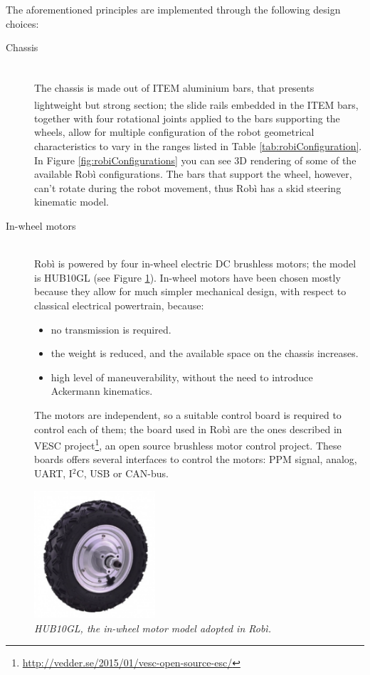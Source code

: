 The aforementioned principles are implemented through the following design choices:
\begin{description}
	\item[Chassis] \hfill \\ The chassis is made out of ITEM\textsuperscript{\textregistered} aluminium bars, that presents lightweight but strong section; the slide rails embedded in the ITEM\textsuperscript{\textregistered} bars, together with four rotational joints applied to the bars supporting the wheels, allow for multiple configuration of the robot geometrical characteristics to vary in the ranges listed in Table \ref{tab:robiConfiguration}. In Figure \ref{fig:robiConfigurations} you can see 3D rendering of some of the available Robì configurations. The bars that support the wheel, however, can't rotate during the robot movement, thus Robì has a skid steering kinematic model.
	
	\item[In-wheel motors] \hfill \\ Robì is powered by four in-wheel electric DC brushless motors; the model is HUB10GL (see Figure \ref{fig:robiMotori}). In-wheel motors have been chosen mostly because they allow for much simpler mechanical design, with respect to classical electrical powertrain, because:
	\begin{itemize}
		\item no transmission is required.
		\item the weight is reduced, and the available space on the chassis increases.
		\item high level of maneuverability, without the need to introduce Ackermann kinematics.
	\end{itemize}
	The motors are independent, so a suitable control board is required to control each of them; the board used in Robì are the ones described in VESC project\footnote{\url{http://vedder.se/2015/01/vesc-open-source-esc/}},
an open source brushless motor control project. These boards offers several interfaces to control the motors:  PPM signal, analog, UART, I$^2$C, USB  or CAN-bus.
\end{description}

\begin{figure}
	\centering
	\includegraphics[width=0.4\textwidth]{Images/robi/motore.png}
	\caption{\textit{HUB10GL, the in-wheel motor model adopted in Robì.}}
	\label{fig:robiMotori}
\end{figure}


